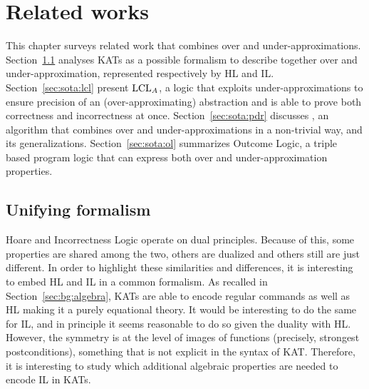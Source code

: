 
\chapter{Related works}\label{ch:sota}
This chapter surveys related work that combines over and under-approximations.
Section~\ref{sec:sota:kat} analyses KATs as a possible formalism to describe together over and under-approximation, represented respectively by HL and IL.
Section~\ref{sec:sota:lcl} present $\text{LCL}_A$, a logic that exploits under-approximations to ensure precision of an (over-approximating) abstraction and is able to prove both correctness and incorrectness at once.
Section~\ref{sec:sota:pdr} discusses , an algorithm that combines over and under-approximations in a non-trivial way, and its generalizations.
Section~\ref{sec:sota:ol} summarizes Outcome Logic, a triple based program logic that can express both over and under-approximation properties.

\section{Unifying formalism}\label{sec:sota:kat}
Hoare and Incorrectness Logic operate on dual principles. Because of this, some properties are shared among the two, others are dualized and others still are just different. In order to highlight these similarities and differences, it is interesting to embed HL and IL in a common formalism. As recalled in Section~\ref{sec:bg:algebra}, KATs are able to encode regular commands \cite{Kozen97} as well as HL \cite{Kozen00} making it a purely equational theory.
It would be interesting to do the same for IL, and in principle it seems reasonable to do so given the duality with HL. However, the symmetry is at the level of images of functions (precisely, strongest postconditions), something that is not explicit in the syntax of KAT. Therefore, it is interesting to study which additional algebraic properties are needed to encode IL in KATs.

